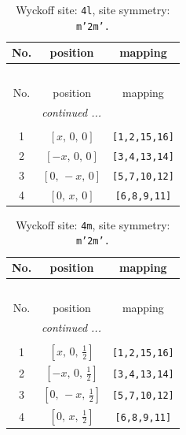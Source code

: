 \documentclass[fleqn,8pt]{jsarticle}
\begin{document}
\renewcommand{\arraystretch}{1.2}
\begin{longtable}{ccc}
\caption{Wyckoff site: {\tt 4l}, site symmetry: {\tt m'2m'.}}
 \\
 \hline \hline
No. & position & mapping \\ \hline \endfirsthead

\multicolumn{2}{l}{\tablename\ \thetable{}} \\
 \hline \hline
No. & position & mapping \\ \hline \endhead

 \hline \hline
\multicolumn{2}{r}{\footnotesize\it continued ...} \\ \endfoot

 \hline \hline
\multicolumn{2}{r}{} \\ \endlastfoot

1 & $\left[ x,\, 0,\, 0 \right]$ & {\tt [1,2,15,16]} \\ \hline
2 & $\left[ - x,\, 0,\, 0 \right]$ & {\tt [3,4,13,14]} \\ \hline
3 & $\left[ 0,\, - x,\, 0 \right]$ & {\tt [5,7,10,12]} \\ \hline
4 & $\left[ 0,\, x,\, 0 \right]$ & {\tt [6,8,9,11]} \\
\end{longtable}
\renewcommand{\arraystretch}{1.2}
\begin{longtable}{ccc}
\caption{Wyckoff site: {\tt 4m}, site symmetry: {\tt m'2m'.}}
 \\
 \hline \hline
No. & position & mapping \\ \hline \endfirsthead

\multicolumn{2}{l}{\tablename\ \thetable{}} \\
 \hline \hline
No. & position & mapping \\ \hline \endhead

 \hline \hline
\multicolumn{2}{r}{\footnotesize\it continued ...} \\ \endfoot

 \hline \hline
\multicolumn{2}{r}{} \\ \endlastfoot

1 & $\left[ x,\, 0,\, \frac{1}{2} \right]$ & {\tt [1,2,15,16]} \\ \hline
2 & $\left[ - x,\, 0,\, \frac{1}{2} \right]$ & {\tt [3,4,13,14]} \\ \hline
3 & $\left[ 0,\, - x,\, \frac{1}{2} \right]$ & {\tt [5,7,10,12]} \\ \hline
4 & $\left[ 0,\, x,\, \frac{1}{2} \right]$ & {\tt [6,8,9,11]} \\
\end{longtable}
\end{document}
